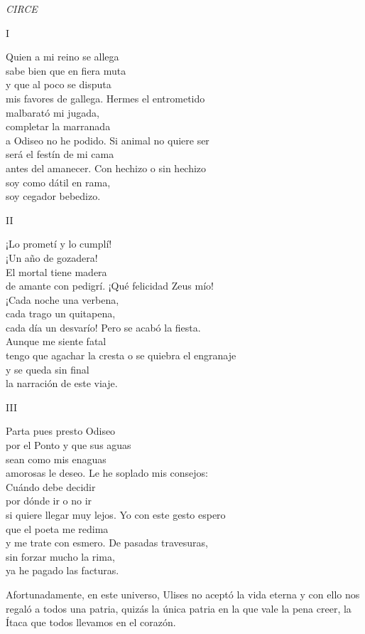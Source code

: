 \emph{CIRCE}

I

\begin{versocita}
Quien a mi reino se allega\\
sabe bien que en fiera muta\\
y que al poco se disputa\\
mis favores de gallega.
\stanzabreak
Hermes el entrometido\\
malbarató mi jugada,\\
completar la marranada\\
a Odiseo no he podido.
\stanzabreak
Si animal no quiere ser\\
será el festín de mi cama\\
antes del amanecer.
\stanzabreak
Con hechizo o sin hechizo\\
soy como dátil en rama,\\
soy cegador bebedizo.
\end{versocita}

II

\begin{versocita}
¡Lo prometí y lo cumplí!\\
¡Un año de gozadera!\\
El mortal tiene madera\\
de amante con pedigrí.
\stanzabreak
¡Qué felicidad Zeus mío!\\
¡Cada noche una verbena,\\
cada trago un quitapena,\\
cada día un desvarío!
\stanzabreak
Pero se acabó la fiesta.\\
Aunque me siente fatal\\
tengo que agachar la cresta
\stanzabreak
o se quiebra el engranaje\\
y se queda sin final\\
la narración de este viaje.
\end{versocita}

III

\begin{versocita}
Parta pues presto Odiseo\\
por el Ponto y que sus aguas\\
sean como mis enaguas\\
amorosas le deseo.
\stanzabreak
Le he soplado mis consejos:\\
Cuándo debe decidir\\
por dónde ir o no ir\\
si quiere llegar muy lejos.
\stanzabreak
Yo con este gesto espero\\
que el poeta me redima\\
y me trate con esmero.
\stanzabreak
De pasadas travesuras,\\
sin forzar mucho la rima,\\
ya he pagado las facturas.
\end{versocita}

Afortunadamente, en este universo, Ulises no aceptó la vida eterna y con ello nos regaló a todos una patria, quizás la única patria en la que vale la pena creer, la Ítaca que todos llevamos en el corazón.
